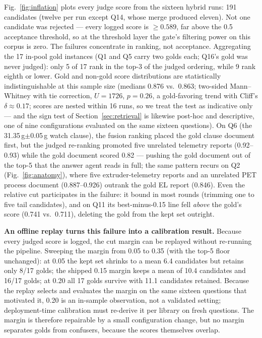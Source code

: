 Fig.~\ref{fig:inflation} plots every judge score from the sixteen hybrid
runs: 191 candidates (twelve per run except Q14, whose merge produced
eleven). Not one candidate was rejected --- every logged score is
$\geq 0.589$, far above the 0.5 acceptance threshold, so at the threshold
layer the gate's filtering power on this corpus is zero. The failures
concentrate in ranking, not acceptance. Aggregating the 17 in-pool gold
instances (Q1 and Q5 carry two golds each; Q16's gold was never judged):
only 5 of 17 rank in the top-3 of the judged ordering, while 9 rank eighth
or lower. Gold and non-gold score distributions are statistically
indistinguishable at this sample size (medians 0.876 vs.\ 0.863;
two-sided Mann--Whitney with tie correction, $U = 1726$, $p = 0.26$, a
gold-favoring trend with Cliff's
$\delta \approx 0.17$; scores are nested within 16 runs, so we treat the
test as indicative only --- and the sign test of
Section~\ref{sec:retrieval} is likewise post-hoc and descriptive, one of
nine configurations evaluated on the same sixteen questions). On Q6 (the 31.35\,g$\pm$0.05\,g watch
clause), the fusion ranking placed the gold clause document first, but the
judged re-ranking promoted five unrelated telemetry reports (0.92--0.93)
while the gold document scored 0.82 --- pushing the gold document out of
the top-5 that the answer agent reads in full; the same pattern recurs on
Q2 (Fig.~\ref{fig:anatomy}), where five extruder-telemetry reports and an
unrelated PET process document (0.887--0.926) outrank the gold EL report
(0.846). Even the relative cut participates in the failure: it
bound in most rounds (trimming one to five tail candidates), and on Q11
its best-minus-0.15 line fell \emph{above} the gold's score (0.741 vs.\
0.711), deleting the gold from the kept set outright.

\textbf{An offline replay turns this failure into a calibration result.}
Because every judged score is logged, the cut margin can be replayed
without re-running the pipeline. Sweeping the margin from 0.05 to 0.35
(with the top-5 floor unchanged): at 0.05 the kept set shrinks to a mean
6.4 candidates but retains only 8/17 golds; the shipped 0.15 margin keeps
a mean of 10.4 candidates and 16/17 golds; at 0.20 all 17 golds survive
with 11.1 candidates retained. Because the replay selects and evaluates
the margin on the same sixteen questions that motivated it, 0.20 is an
in-sample observation, not a validated setting; deployment-time
calibration must re-derive it per library on fresh questions. The margin
is therefore repairable by a
small configuration change, but no margin separates golds from
confusers, because the scores themselves overlap.

